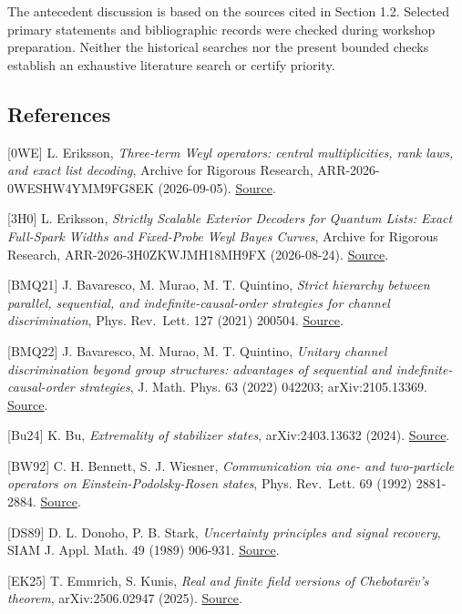 \documentclass[
  11pt,
  a4paper,
]{article}
\begin{document}
The antecedent discussion is based on the sources cited in Section 1.2.
Selected primary statements and bibliographic records were checked
during workshop preparation. Neither the historical searches nor the
present bounded checks establish an exhaustive literature search or
certify priority.

\subsection{References}\label{references}

{[}0WE{]} L. Eriksson, \emph{Three-term Weyl operators: central
multiplicities, rank laws, and exact list decoding}, Archive for
Rigorous Research, ARR-2026-0WESHW4YMM9FG8EK (2026-09-05).
\href{https://airr.science/papers/ARR-2026-0WESHW4YMM9FG8EK/}{Source}.

{[}3H0{]} L. Eriksson, \emph{Strictly Scalable Exterior Decoders for
Quantum Lists: Exact Full-Spark Widths and Fixed-Probe Weyl Bayes
Curves}, Archive for Rigorous Research, ARR-2026-3H0ZKWJMH18MH9FX
(2026-08-24).
\href{https://airr.science/papers/ARR-2026-3H0ZKWJMH18MH9FX/}{Source}.

{[}BMQ21{]} J. Bavaresco, M. Murao, M. T. Quintino, \emph{Strict
hierarchy between parallel, sequential, and indefinite-causal-order
strategies for channel discrimination}, Phys. Rev.~Lett. 127 (2021)
200504. \href{https://doi.org/10.1103/PhysRevLett.127.200504}{Source}.

{[}BMQ22{]} J. Bavaresco, M. Murao, M. T. Quintino, \emph{Unitary
channel discrimination beyond group structures: advantages of sequential
and indefinite-causal-order strategies}, J. Math. Phys. 63 (2022)
042203; arXiv:2105.13369.
\href{https://doi.org/10.1063/5.0075919}{Source}.

{[}Bu24{]} K. Bu, \emph{Extremality of stabilizer states},
arXiv:2403.13632 (2024).
\href{https://arxiv.org/abs/2403.13632}{Source}.

{[}BW92{]} C. H. Bennett, S. J. Wiesner, \emph{Communication via one-
and two-particle operators on Einstein-Podolsky-Rosen states}, Phys.
Rev.~Lett. 69 (1992) 2881-2884.
\href{https://doi.org/10.1103/PhysRevLett.69.2881}{Source}.

{[}DS89{]} D. L. Donoho, P. B. Stark, \emph{Uncertainty principles and
signal recovery}, SIAM J. Appl. Math. 49 (1989) 906-931.
\href{https://doi.org/10.1137/0149053}{Source}.

{[}EK25{]} T. Emmrich, S. Kunis, \emph{Real and finite field versions of
Chebotarëv's theorem}, arXiv:2506.02947 (2025).
\href{https://arxiv.org/abs/2506.02947}{Source}.
\end{document}
